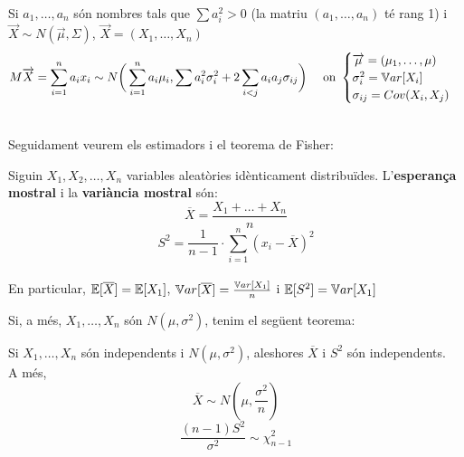 \begin{col}
  Si $a_{1},\ldots,a_{n}$ són nombres tals que $\sum a_{i}^2 > 0$ (la matriu $(a_{1},\ldots,a_{n})$ té rang 1) i $\overrightarrow{X}\sim N(\overrightarrow{\mu}, \Sigma)$, $\overrightarrow{X} = (X_{1},\ldots,X_{n})$
  \[
    M\overrightarrow{X} = \sum_{i=1}^{n} a_{i}x_{i} \sim N\bigg(\sum_{i=1}^{n} a_{i}\mu_{i}, \sum a_{i}^{2}\sigma_{i}^{2} + 2\sum_{i<j}a_{i}a_{j}\sigma_{ij}\bigg) \quad \text{ on } 
    \begin{cases}
      \overrightarrow{\mu} = (\mu_{1},\ldots,\mu) \\
      \sigma_{i}^{2} = \mathbb{V} ar[X_{i}] \\
      \sigma_{ij} = Cov(X_{i}, X_{j})
    \end{cases}
  \]
\end{col}

\-\\
Seguidament veurem els estimadors i el teorema de Fisher:

\begin{defi}
  Siguin $X_{1}, X_{2}, \ldots, X_{n}$ variables aleatòries idènticament distribuïdes. L'\textbf{esperança mostral} i la \textbf{variància mostral} són: \\
  \[
    \overline{X} = \frac{X_{1}+\ldots+X_{n}}{n}
  \]
  \[
    S^{2} = \frac{1}{n-1}\cdot\sum_{i=1}^{n}(x_{i} - \overline{X})^{2}
  \]
  \-\\
  En particular, $\mathbb{E}[\overline{X}] = \mathbb{E}[X_{1}]$, $\mathbb{V} ar[\overline{X}] = \frac{\mathbb{V} ar[X_{1}]}{n}$ i $\mathbb{E}[S^{2}] = \mathbb{V} ar[X_{1}]$ \\
  
\end{defi}

Si, a més, $X_{1},\ldots,X_{n}$ són $N(\mu,\sigma^{2})$, tenim el següent teorema:

\begin{thm}[(Fisher)]
  Si $X_{1},\ldots, X_{n}$ són independents i $N(\mu, \sigma^{2})$, aleshores $\overline{X}$ i $S^{2}$ són independents. \\ 
  A més, $$\overline{X} \sim N(\mu, \frac{\sigma^{2}}{n})$$ $$\frac{(n-1)S^{2}}{\sigma^2} \sim \chi_{n-1}^{2}$$
\end{thm}
